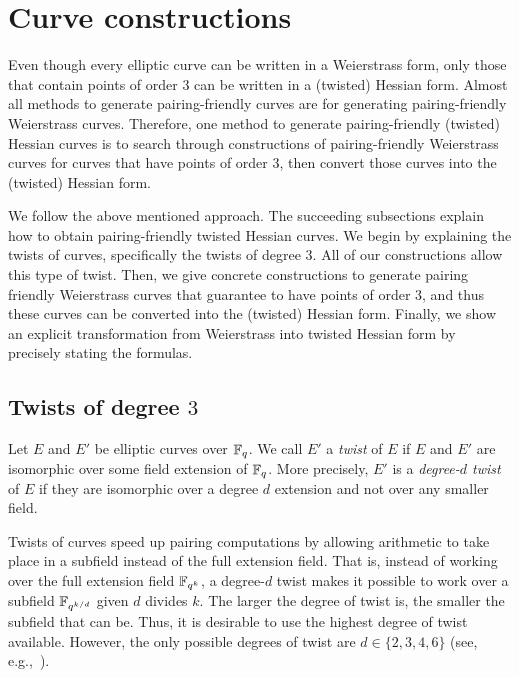\section{Curve constructions}
\label{sec:curves}

Even though every elliptic curve can be written in a Weierstrass form,
only those that contain points of order 3 can be written in a (twisted) Hessian form.
Almost all methods to generate pairing-friendly curves are for generating
pairing-friendly Weierstrass curves.
Therefore, one method to generate pairing-friendly (twisted) Hessian curves is to
search through constructions of pairing-friendly Weierstrass curves for curves that have points of order 3,
then convert those curves into the (twisted) Hessian form.

We follow the above mentioned approach.
The succeeding subsections explain how to obtain pairing-friendly twisted Hessian curves.
We begin by explaining the twists of curves, specifically the twists of degree $3$.
All of our constructions allow this type of twist.
Then, we give concrete constructions to generate pairing friendly Weierstrass curves that guarantee to have points of order 3,
and thus these curves can be converted into the (twisted) Hessian form.
Finally, we show an explicit transformation from Weierstrass into twisted Hessian form by precisely stating the formulas.

\subsection{Twists of degree $3$}
\label{twist}
Let $E$ and $E'$ be elliptic curves over $\mathbb{F}_{q}$.
We call $E'$ a \emph{twist} of $E$ if $E$ and $E'$ are isomorphic over some field extension of $\mathbb{F}_{q}$.
More precisely, $E'$ is a {\emph{degree-$d$ twist}} of $E$ if they are isomorphic over a degree $d$ extension and not over any smaller field.

Twists of curves speed up pairing computations by allowing arithmetic to take place in a subfield instead of the full extension field.
That is, instead of working over the full extension field $\mathbb{F}_{q^k}$, a degree-$d$ twist makes it possible to work over a subfield $\mathbb{F}_{q^{k/d}}$
given $d$ divides $k$.
The larger the degree of twist is, the smaller the subfield that can be.
Thus, it is desirable to use the highest degree of twist available.
However, the only possible degrees of twist are $d \in \{2,3,4,6\}$ (see, e.g.,~\cite{2009/silverman-arithmetic}).

